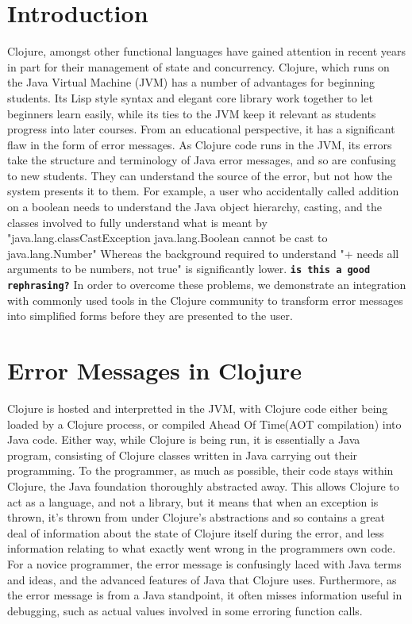 \documentclass[12pt]{article}
\newcommand{\comment}[1]{{\bf \tt  {#1}}}
\begin{document}
\section{Introduction}
Clojure, amongst other functional languages have gained attention in recent years
in part for their management of state and concurrency.
Clojure, which runs on the Java Virtual Machine (JVM) has a number of advantages for beginning students.
Its Lisp style syntax and elegant core library
 work together to let beginners learn easily, while
its ties to the JVM keep it relevant as students progress into later courses.
From an educational perspective, it has a significant flaw in the form of error messages.
As Clojure code runs in the JVM, its errors take the structure and terminology of Java error messages,
and so are confusing to new students. They can understand the source of the error,
but not how the system presents it to them.
For example, a user who accidentally called addition on a boolean needs
 to understand the Java object hierarchy, casting,
 and the classes involved to fully understand what is meant by
 "java.lang.classCastException java.lang.Boolean cannot be cast to java.lang.Number"
Whereas the background required to understand "+ needs all arguments to be numbers, not true"
 is significantly lower. \comment{is this a good rephrasing?}
 In order to overcome these problems,
  we demonstrate an integration with commonly used tools in the Clojure community
 to transform error messages into simplified forms before they are presented to the user.

\cite{Hickey:2008}

\section{Error Messages in Clojure}
Clojure is hosted and interpretted in the JVM, with Clojure code either being
loaded by a Clojure process, or compiled Ahead Of Time(AOT compilation) into Java code.
Either way, while Clojure is being run, it is essentially a Java program, consisting of
Clojure classes written in Java carrying out their programming.
To the programmer, as much as possible, their code stays within Clojure,
the Java foundation thoroughly abstracted away.
This allows Clojure to act as a language, and not a library, but it means
 that when an exception is thrown, it's thrown from under Clojure's abstractions
 and so contains a great deal of information about the state of Clojure itself
 during the error, and less information relating to what exactly went wrong in the
 programmers own code.
 For a novice programmer, the error message is confusingly laced
  with Java terms and ideas, and the advanced features of Java that Clojure uses.
  Furthermore, as the error message is from a Java standpoint, it often misses
  information useful in debugging, such as actual values involved in some erroring function calls.
\end{document}
